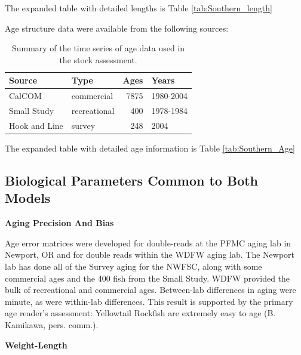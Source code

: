 \documentclass[12pt,]{article}
\begin{document}
The expanded table with detailed lengths is Table
\ref{tab:Southern_length}

Age structure data were available from the following sources:

\vspace{.5cm}

\begin{table}[ht]
\centering
\caption{Summary of the
                                              time series of age data used in the stock
                                              assessment.} 
\label{tab:Age_sources_South}
\begin{tabular}{llrl}
  \hline
Source & Type & Ages & Years \\ 
  \hline
CalCOM & commercial & 7875 & 1980-2004 \\ 
  Small Study & recreational & 400 & 1978-1984 \\ 
  Hook and Line & survey & 248 & 2004 \\ 
   \hline
\end{tabular}
\end{table}

The expanded table with detailed age information is Table
\ref{tab:Southern_Age}

\clearpage

\subsection{\texorpdfstring{Biological Parameters Common to Both Models
\label{bio-params}}{Biological Parameters Common to Both Models }}\label{biological-parameters-common-to-both-models}

\vspace{.5cm}

\textbf{Aging Precision And Bias}

Age error matrices were developed for double-reads at the PFMC aging lab
in Newport, OR and for double reads within the WDFW aging lab. The
Newport lab has done all of the Survey aging for the NWFSC, along with
some commercial ages and the 400 fish from the Small Study. WDFW
provided the bulk of recreational and commercial ages. Between-lab
differences in aging were minute, as were within-lab differences. This
result is supported by the primary age reader's assessment: Yellowtail
Rockfish are extremely easy to age (B. Kamikawa, pers. comm.).

\vspace{.5cm}

\textbf{Weight-Length}
\end{document}
